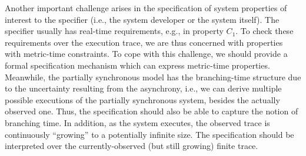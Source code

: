 \documentclass[10pt,conference,compsocconf,letterpaper]{IEEEtran}
\begin{document}
Another important challenge arises in the specification of system properties of interest to the specifier (i.e., the system developer or the system itself). The specifier usually has real-time requirements, e.g., in property $C_1$. To check these requirements over the execution trace, we are thus concerned with properties with metric-time constraints. To cope with this challenge, we should provide a formal specification mechanism which can express metric-time properties. Meanwhile, the partially synchronous model has the branching-time structure due to the uncertainty resulting from the asynchrony, i.e., we can derive multiple possible executions of the partially synchronous system, besides the actually observed one. Thus, the specification should also be able to capture the notion of branching time. In addition, as the system executes, the observed trace is continuously ``growing'' to a potentially infinite size. The specification should be interpreted over the currently-observed (but still growing) finite trace.
\end{document}
